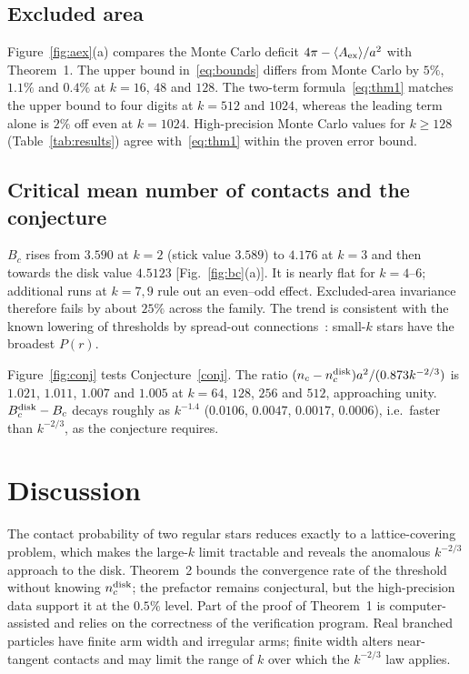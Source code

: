 \documentclass[pre,twocolumn,superscriptaddress,nofootinbib]{revtex4-2}
\newcommand{\Aex}{\langle A_{\rm ex}\rangle}
\newcommand{\nd}{n_c^{\rm disk}}
\begin{document}
\subsection{Excluded area}
Figure~\ref{fig:aex}(a) compares the Monte Carlo deficit $4\pi-\Aex/a^2$ with Theorem~1.
The upper bound in~\eqref{eq:bounds} differs from Monte Carlo by $5\%$, $1.1\%$ and $0.4\%$ at $k=16$, $48$ and $128$.
The two-term formula~\eqref{eq:thm1} matches the upper bound to four digits at $k=512$ and $1024$, whereas the leading term alone is $2\%$ off even at $k=1024$.
High-precision Monte Carlo values for $k\ge128$ (Table~\ref{tab:results}) agree with~\eqref{eq:thm1} within the proven error bound.


\subsection{Critical mean number of contacts and the conjecture}
$B_c$ rises from $3.590$ at $k=2$ (stick value $3.589$) to $4.176$ at $k=3$ and then towards the disk value $4.5123$ [Fig.~\ref{fig:bc}(a)].
It is nearly flat for $k=4$--$6$; additional runs at $k=7,9$ rule out an even--odd effect.
Excluded-area invariance therefore fails by about $25\%$ across the family.
The trend is consistent with the known lowering of thresholds by spread-out connections~\cite{Franceschetti2005}: small-$k$ stars have the broadest $P(r)$.

Figure~\ref{fig:conj} tests Conjecture~\ref{conj}.
The ratio $(n_c-\nd)a^2/(0.873k^{-2/3})$ is $1.021$, $1.011$, $1.007$ and $1.005$ at $k=64$, $128$, $256$ and $512$, approaching unity.
$B_c^{\rm disk}-B_c$ decays roughly as $k^{-1.4}$ ($0.0106$, $0.0047$, $0.0017$, $0.0006$), i.e.\ faster than $k^{-2/3}$, as the conjecture requires.



\section{Discussion}
The contact probability of two regular stars reduces exactly to a lattice-covering problem, which makes the large-$k$ limit tractable and reveals the anomalous $k^{-2/3}$ approach to the disk.
Theorem~2 bounds the convergence rate of the threshold without knowing $\nd$; the prefactor remains conjectural, but the high-precision data support it at the $0.5\%$ level.
Part of the proof of Theorem~1 is computer-assisted and relies on the correctness of the verification program.
Real branched particles have finite arm width and irregular arms; finite width alters near-tangent contacts and may limit the range of $k$ over which the $k^{-2/3}$ law applies.
\end{document}
